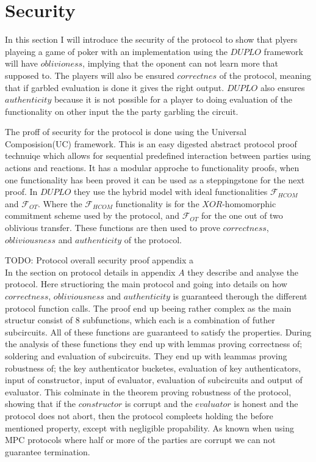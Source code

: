 \documentclass[twoside,11pt,openright]{report}
\newcommand{\todo}[1]{}
\renewcommand{\todo}[1]{{\color{red} TODO: {#1}} \\}
\begin{document}
\section{Security}
\label{sec:secutity}
In this section I will introduce the security of the protocol to show that plyers playeing a game of poker with an implementation using the $DUPLO$ framework will have $oblivioness$, implying that the oponent can not learn more that supposed to. The players will also be ensured $correctnes$ of the protocol, meaning that if garbled evaluation is done it gives the right output. $DUPLO$ also ensures $authenticity$ because it is not possible for a player to doing evaluation of the functionality on other input the the party garbling the circuit.

\bigskip

The proff of security for the protocol is done using the Universal Composision(UC) framework. This is an easy digested abstract protocol proof technuiqe which allows for sequential predefined interaction between parties using actions and reactions. It has a modular approche to functionality proofs, when one functionality has been proved it can be used as a steppingstone for the next proof. In $DUPLO$ they use the hybrid model with ideal functionalities $\mathcal{F}_{HCOM}$ and $\mathcal{F}_{OT}$. Where the $\mathcal{F}_{HCOM}$ functionality is for the $XOR$-homomorphic commitment scheme used by the protocol, and $\mathcal{F}_{OT}$ for the one out of two oblivious transfer. These functions are then used to prove $correctness$, $obliviousness$ and $authenticity$ of the protocol. 

\todo{Protocol overall security proof appendix a}
In the section on protocol details in  appendix $A$ they describe and analyse the protocol. Here structioring the main protocol and going into details on how $correctness$, $obliviousness$ and $authenticity$ is guaranteed therough the different protocol function calls. The proof end up beeing rather complex as the main structur consist of $8$ subfunctions, which each is a combination of futher subcircuits. All of these functions are guaranteed to satisfy the properties. During the analysis of these functions they end up with lemmas proving correctness of; soldering and evaluation of subcircuits. They end up with leammas proving robustness of; the key authenticator bucketes, evaluation of key authenticators, input of constructor, input of evaluator, evaluation of subcircuits and output of evaluator. This colminate in the theorem proving robustness of the protocol, showing that if the $constructor$ is corrupt and the $evaluator$ is honest and the protocol does not abort, then the protocol compleets holding the before mentioned property, except with negligible propability. As known when using MPC protocols where half or more of the parties are corrupt we can not guarantee termination.
\end{document}
